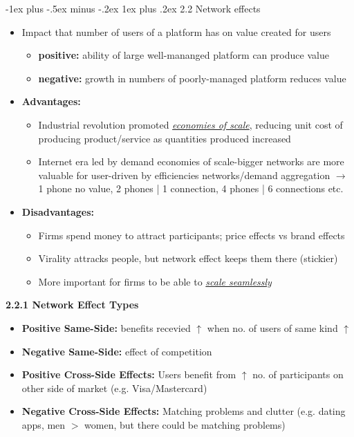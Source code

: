 \documentclass[10pt,landscape]{article}
\makeatletter
\newcommand{\subsubsubsection}{\@startsection{subsubsection}{3}{0mm}%
                                {-1ex plus -.5ex minus -.2ex}%
                                {1ex plus .2ex}%
                                {\normalfont\scriptsize\bfseries}}
\makeatother
\begin{document}
\begin{multicols*}{3}
\subsubsubsection{2.2 Network effects}
\begin{itemize}[topsep=0pt,noitemsep,wide=0pt, leftmargin=\dimexpr{} + 2\relax]
    \item Impact that number of users of a platform has on value created for users
    \begin{itemize}[topsep=0pt,noitemsep,wide=0pt, leftmargin=\dimexpr{} + 2\relax]
        \item \textbf{positive:} ability of large well-mananged platform can produce value
        \item \textbf{negative:} growth in numbers of poorly-managed platform reduces value
    \end{itemize}
    \item \textbf{Advantages:}
    \begin{itemize}[topsep=0pt,noitemsep,wide=0pt, leftmargin=\dimexpr{} + 2\relax]
        \item Industrial revolution promoted \textit{\underline{economies of scale}}, reducing unit cost of producing product/service as quantities produced increased
        \item Internet era led by demand economies of scale-bigger networks are more valuable for user-driven by efficiencies networks/demand aggregation $\rightarrow$ 1 phone no value, 2 phones | 1 connection, 4 phones | 6 connections etc.
    \end{itemize}
    \item \textbf{Disadvantages:}
    \begin{itemize}[topsep=0pt,noitemsep,wide=0pt, leftmargin=\dimexpr{} + 2\relax]
        \item Firms spend money to attract participants; price effects vs brand effects
        \item Virality attracks people, but network effect keeps them there (stickier)
        \item More important for firms to be able to \textit{\underline{scale seamlessly}}
    \end{itemize}
\end{itemize}

\textbf{2.2.1 Network Effect Types}
\begin{itemize}[topsep=0pt,noitemsep,wide=0pt, leftmargin=\dimexpr{} + 2\relax]
    \item \textbf{Positive Same-Side:} benefits recevied $\uparrow$ when no. of users of same kind $\uparrow$
    \item \textbf{Negative Same-Side:} effect of competition
    \item \textbf{Positive Cross-Side Effects:} Users benefit from $\uparrow$ no. of participants on other side of market (e.g. Visa/Mastercard)
    \item \textbf{Negative Cross-Side Effects:} Matching problems and clutter (e.g. dating apps, men $>$ women, but there could be matching problems)
\end{itemize}


\end{multicols*}
\end{document}
